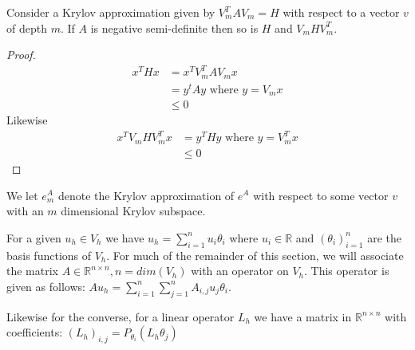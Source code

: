 \begin{lemma} \label{lemma:Hnegatvesemidefinite}
    Consider a Krylov approximation given by $V_m^TAV_m = H$ with respect to a vector $v$ of depth $m$.
    If $A$ is negative semi-definite then so is $H$ and $V_mHV_m^T$.
\end{lemma}
\begin{proof}
    \begin{align*}
        x^THx &= x^T V_m^TAV_mx\\
        &= y^tAy \text{ where $y = V_mx$}\\
        &\leq 0
    \end{align*}
    Likewise
    \begin{align*}
        x^TV_mHV_m^Tx &= y^THy \text{ where $y=V_m^Tx$}\\
        &\leq 0
    \end{align*}
\end{proof}

\begin{definition}
    We let $e_m^A$ denote the Krylov approximation of $e^A$ with respect to some vector $v$ with an $m$ dimensional Krylov subspace.
\end{definition}

For a given $u_h \in V_h$ we have $u_h = \sum^n_{i=1}u_i\theta_i$ where $u_i \in \mathbb{R}$ and $(\theta_i)_{i=1}^n$ are the basis functions of $V_h$.
For much of the remainder of this section, we will associate the matrix $A\in \mathbb{R}^{n\times n}, n=dim(V_h)$ with an operator on $V_h$.
This operator is given as follows: $Au_h = \sum^n_{i=1}\sum^n_{j=1}A_{i,j}u_j\theta_i$.

Likewise for the converse, for a linear operator $L_h$ we have a matrix in $\mathbb{R}^{n\times n}$ with coefficients:
$(L_h)_{i,j} = P_{\theta_i}(L_h\theta_j)$

